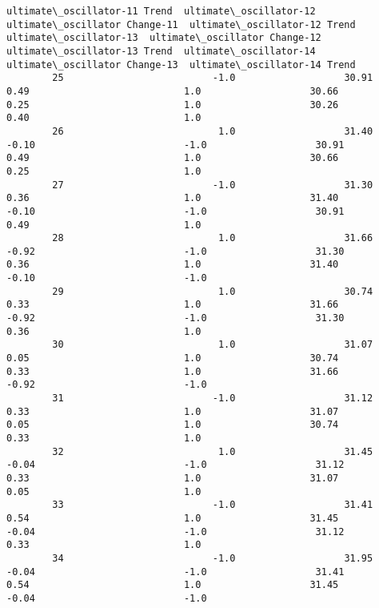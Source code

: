 \documentclass[11pt]{article}
\begin{document}
\begin{Verbatim}[commandchars=\\\{\}]
            ultimate\_oscillator-11 Trend  ultimate\_oscillator-12  ultimate\_oscillator Change-11  ultimate\_oscillator-12 Trend  ultimate\_oscillator-13  ultimate\_oscillator Change-12  ultimate\_oscillator-13 Trend  ultimate\_oscillator-14  ultimate\_oscillator Change-13  ultimate\_oscillator-14 Trend  
        25                          -1.0                   30.91                           0.49                           1.0                   30.66                           0.25                           1.0                   30.26                           0.40                           1.0  
        26                           1.0                   31.40                          -0.10                          -1.0                   30.91                           0.49                           1.0                   30.66                           0.25                           1.0  
        27                          -1.0                   31.30                           0.36                           1.0                   31.40                          -0.10                          -1.0                   30.91                           0.49                           1.0  
        28                           1.0                   31.66                          -0.92                          -1.0                   31.30                           0.36                           1.0                   31.40                          -0.10                          -1.0  
        29                           1.0                   30.74                           0.33                           1.0                   31.66                          -0.92                          -1.0                   31.30                           0.36                           1.0  
        30                           1.0                   31.07                           0.05                           1.0                   30.74                           0.33                           1.0                   31.66                          -0.92                          -1.0  
        31                          -1.0                   31.12                           0.33                           1.0                   31.07                           0.05                           1.0                   30.74                           0.33                           1.0  
        32                           1.0                   31.45                          -0.04                          -1.0                   31.12                           0.33                           1.0                   31.07                           0.05                           1.0  
        33                          -1.0                   31.41                           0.54                           1.0                   31.45                          -0.04                          -1.0                   31.12                           0.33                           1.0  
        34                          -1.0                   31.95                          -0.04                          -1.0                   31.41                           0.54                           1.0                   31.45                          -0.04                          -1.0  
        

\end{Verbatim}
\end{document}
